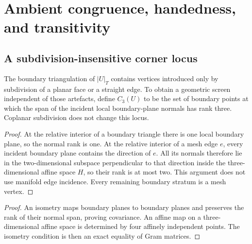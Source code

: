 \section{Ambient congruence, handedness, and transitivity}
\label{sec:ambient}

\subsection{A subdivision-insensitive corner locus}

The boundary triangulation of $|U|_T$ contains vertices introduced only by
subdivision of a planar face or a straight edge.  To obtain a geometric
screen independent of those artefacts, define $C_3(U)$ to be the set of
boundary points at which the span of the incident local boundary-plane
normals has rank three.  Coplanar subdivision does not change this locus.

\begin{proof}
At the relative interior of a boundary triangle there is one local boundary
plane, so the normal rank is one.  At the relative interior of a mesh edge
$e$, every incident boundary plane contains the direction of $e$.  All its
normals therefore lie in the two-dimensional subspace perpendicular to that
direction inside the three-dimensional affine space $H$, so their rank is at
most two.  This argument does not use manifold edge incidence.  Every
remaining boundary stratum is a mesh vertex.
\end{proof}

\begin{proof}
An isometry maps boundary planes to boundary planes and preserves the rank of
their normal span, proving covariance.  An affine map on a three-dimensional
affine space is determined by four affinely independent points.  The
isometry condition is then an exact equality of Gram matrices.
\end{proof}


